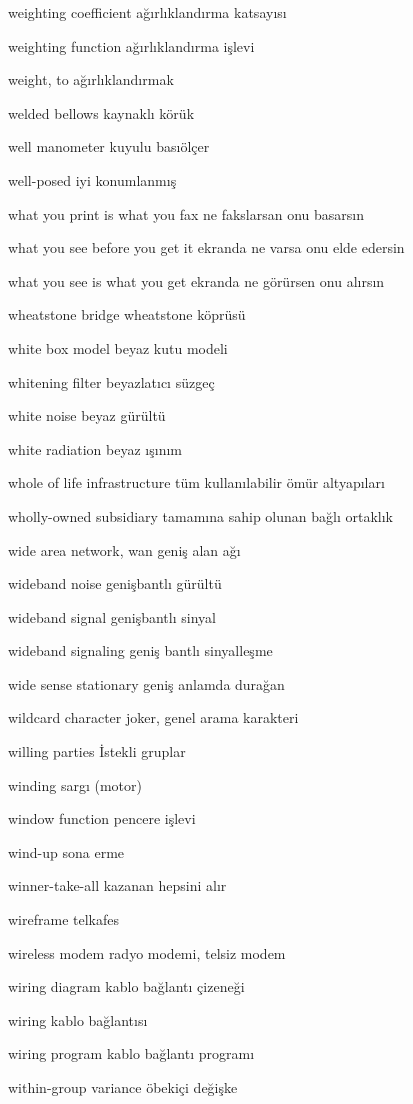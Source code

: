 \documentclass[12pt,fleqn]{article}\usepackage{../../common}
\begin{document}
weighting coefficient ağırlıklandırma katsayısı

weighting function ağırlıklandırma işlevi

weight, to ağırlıklandırmak

welded bellows kaynaklı körük

well manometer kuyulu basıölçer

well-posed iyi konumlanmış

what you print is what you fax ne fakslarsan onu basarsın

what you see before you get it ekranda ne varsa onu elde edersin

what you see is what you get ekranda ne görürsen onu alırsın

wheatstone bridge wheatstone köprüsü

white box model beyaz kutu modeli

whitening filter beyazlatıcı süzgeç

white noise beyaz gürültü

white radiation beyaz ışınım

whole of life infrastructure tüm kullanılabilir ömür altyapıları

wholly-owned subsidiary tamamına sahip olunan bağlı ortaklık

wide area network, wan geniş alan ağı

wideband noise genişbantlı gürültü

wideband signal genişbantlı sinyal

wideband signaling geniş bantlı sinyalleşme

wide sense stationary geniş anlamda durağan

wildcard character joker, genel arama karakteri

willing parties İstekli gruplar

winding sargı (motor)

window function pencere işlevi

wind-up sona erme

winner-take-all kazanan hepsini alır

wireframe telkafes

wireless modem radyo modemi, telsiz modem

wiring diagram kablo bağlantı çizeneği

wiring kablo bağlantısı

wiring program kablo bağlantı programı

within-group variance öbekiçi değişke
\end{document}
